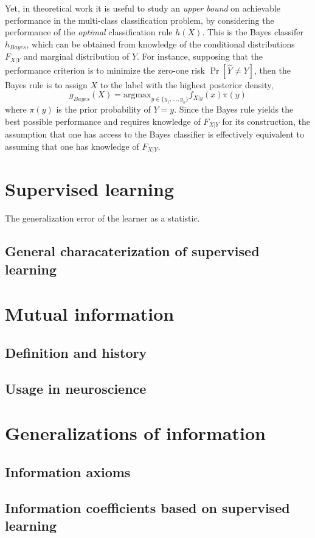 Yet, in theoretical work it is useful to study an \emph{upper bound}
on achievable performance in the multi-class classification problem,
by considering the performance of the \emph{optimal} classification
rule $h(X)$.  This is the Bayes classifer $h_{Bayes}$, which can be
obtained from knowledge of the conditional distributions $F_{X|Y}$ and
marginal distribution of $Y$.  For instance, supposing that the
performance criterion is to minimize the zero-one risk $\Pr[\hat{Y}
  \neq Y]$, then the Bayes rule is to assign $X$ to the label with the
highest posterior density,
\[
g_{Bayes}(X) = \text{argmax}_{y \in \{y_1, \hdots, y_k\}} f_{X|y}(x) \pi(y)
\]
where $\pi(y)$ is the prior probability of $Y = y$.  Since the Bayes
rule yields the best possible performance and requires knowledge of
$F_{X|Y}$ for its construction, the assumption that one has access to
the Bayes classifier is effectively equivalent to assuming that one
has knowledge of $F_{X|Y}$.







\section{Supervised learning}

The generalization error of the learner as a statistic.

\subsection{General characaterization of supervised learning}

\section{Mutual information}

\subsection{Definition and history}

\subsection{Usage in neuroscience}

\section{Generalizations of information}

\subsection{Information axioms}

\subsection{Information coefficients based on supervised learning}

